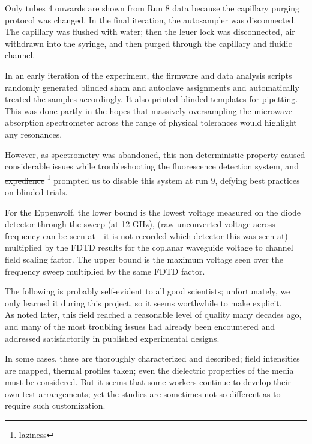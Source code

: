 \documentclass[paper.tex]{subfiles}
\begin{document}
\begin{multicols}{1}
Only tubes 4 onwards are shown from Run 8 data because the capillary purging protocol was changed. In the final iteration, the autosampler was disconnected. The capillary was flushed with water; then the leuer lock was disconnected, air withdrawn into the syringe, and then purged through the capillary and fluidic channel.

In an early iteration of the experiment, the firmware and data analysis scripts randomly generated blinded sham and autoclave assignments and automatically treated the samples accordingly. It also printed blinded templates for pipetting. This was done partly in the hopes that massively oversampling the microwave absorption spectrometer across the range of physical tolerances would highlight any resonances.\cite{first2000} 

However, as spectrometry was abandoned, this non-deterministic property caused considerable issues while troubleshooting the fluorescence detection system, and \st{expedience} \footnote{laziness} prompted us to disable this system at run 9, defying best practices on blinded trials.


For the Eppenwolf, the lower bound is the lowest voltage measured on the diode detector through the sweep (at 12 GHz), (raw unconverted voltage across frequency can be seen at - it is not recorded which detector this was seen at) multiplied by the FDTD results for the coplanar waveguide voltage to channel field scaling factor. The upper bound is the maximum voltage seen over the frequency sweep multiplied by the same FDTD factor.






\begin{tcolorbox}
	
	The following is probably self-evident to all good scientists; unfortunately, we only learned it during this project, so it seems worthwhile to make explicit.\\
	
	As noted later, this field reached a reasonable level of quality many decades ago, and many of the most troubling issues had already been encountered and addressed satisfactorily in published experimental designs\cite{Biological1984}. 
	
	In some cases, these are thoroughly characterized and described; field intensities are mapped, thermal profiles taken; even the dielectric properties of the media must be considered. But it seems that some workers continue to develop their own test arrangements; yet the studies are sometimes not so different as to require such customization. \\
	

\end{tcolorbox}
\end{multicols}
\end{document}
